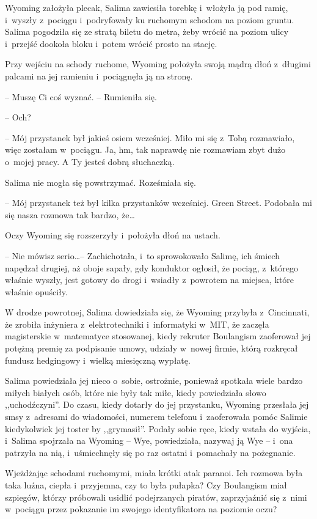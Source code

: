 \documentclass[oneside,polish,11pt,sfheadings]{mwbk}
\begin{document}
Wyoming założyła plecak, Salima zawiesiła torebkę i~włożyła ją pod
ramię, i~wyszły z~pociągu i~podryfowały ku ruchomym schodom na poziom
gruntu. Salima pogodziła się ze stratą biletu do metra, żeby wrócić na
poziom ulicy i~przejść dookoła bloku i~potem wrócić prosto na stację.

Przy wejściu na schody ruchome, Wyoming położyła swoją mądrą dłoń z~długimi palcami na jej ramieniu i~pociągnęła ją na stronę. 

-- Muszę Ci
coś wyznać. -- Rumieniła się.

-- Och?

-- Mój przystanek był jakieś osiem wcześniej. Miło mi się z~Tobą
rozmawiało, więc zostałam w~pociągu. Ja, hm, tak naprawdę nie rozmawiam
zbyt dużo o~mojej pracy. A Ty jesteś dobrą słuchaczką.

Salima nie mogła się powstrzymać. Roześmiała się. 

-- Mój przystanek też
był kilka przystanków wcześniej. Green Street. Podobała mi się nasza
rozmowa tak bardzo, że\ldots 

Oczy Wyoming się rozszerzyły i~położyła dłoń na ustach.

 -- Nie mówisz
serio\ldots  -- Zachichotała, i~to sprowokowało Salimę, ich śmiech napędzał
drugiej, aż oboje sapały, gdy konduktor ogłosił, że pociąg, z~którego
właśnie wyszły, jest gotowy do drogi i~wsiadły z~powrotem na miejsca,
które właśnie opuściły.

W drodze powrotnej, Salima dowiedziała się, że Wyoming przybyła z~Cincinnati, że zrobiła inżyniera z~elektrotechniki i~informatyki w~MIT,
że zaczęła magisterskie w~matematyce stosowanej, kiedy rekruter
Boulangism zaoferował jej potężną premię za podpisanie umowy, udziały w~nowej firmie, którą rozkręcał fundusz hedgingowy i~wielką miesięczną
wypłatę.

Salima powiedziała jej nieco o~sobie, ostrożnie, ponieważ spotkała wiele
bardzo miłych białych osób, które nie były tak miłe, kiedy powiedziała
słowo ,,uchodźczyni''. Do czasu, kiedy dotarły do jej przystanku,
Wyoming przesłała jej smsy z~adresami do wiadomości, numerem telefonu i~zaoferowała pomóc Salimie kiedykolwiek jej toster by ,,grymasił''.
Podały sobie ręce, kiedy wstała do wyjścia, i~Salima spojrzała na
Wyoming -- Wye, powiedziała, nazywaj ją Wye -- i~ona patrzyła na nią, i~uśmiechnęły się po raz ostatni i~pomachały na pożegnanie.

Wjeżdżając schodami ruchomymi, miała krótki atak paranoi. Ich rozmowa
była taka luźna, ciepła i~przyjemna, czy to była pułapka? Czy Boulangism
miał szpiegów, którzy próbowali usidlić podejrzanych piratów,
zaprzyjaźnić się z~nimi w~pociągu przez pokazanie im swojego
identyfikatora na poziomie oczu?
\end{document}
